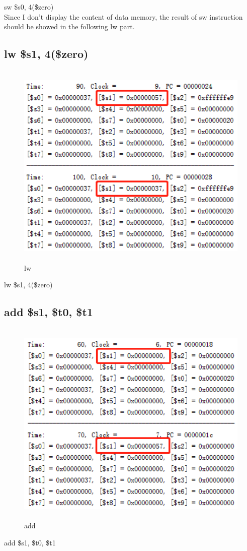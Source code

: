 \documentclass{article}
\begin{document}
sw \$s0, 4(\$zero) \\

Since I don't display the content of data memory, the result of sw instruction should be showed in the following lw part.

\subsection{lw \$s1, 4(\$zero)}
\begin{figure}[H]
    \centering
    \includegraphics[height = 10cm,width = 13cm]{lw.png}
    \caption{lw}
    \label{fig:my_label}
\end{figure}

lw \$s1, 4(\$zero)
\subsection{add \$s1, \$t0, \$t1}
\begin{figure}[H]
    \centering
    \includegraphics[height = 10cm,width = 13cm]{add.png}
    \caption{add}
    \label{fig:my_label}
\end{figure}
add \$s1, \$t0, \$t1
\end{document}
